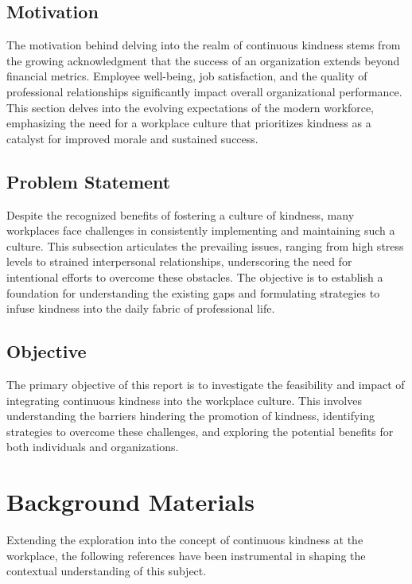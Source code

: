 \documentclass[a4paper, 11pt]{report}
\begin{document}
\subsection{Motivation}

The motivation behind delving into the realm of continuous kindness stems from the growing acknowledgment that the success of an organization extends beyond financial metrics. Employee well-being, job satisfaction, and the quality of professional relationships significantly impact overall organizational performance. This section delves into the evolving expectations of the modern workforce, emphasizing the need for a workplace culture that prioritizes kindness as a catalyst for improved morale and sustained success.

\subsection{Problem Statement}
Despite the recognized benefits of fostering a culture of kindness, many workplaces face challenges in consistently implementing and maintaining such a culture. This subsection articulates the prevailing issues, ranging from high stress levels to strained interpersonal relationships, underscoring the need for intentional efforts to overcome these obstacles. The objective is to establish a foundation for understanding the existing gaps and formulating strategies to infuse kindness into the daily fabric of professional life.

\subsection{Objective}
The primary objective of this report is to investigate the feasibility and impact of integrating continuous kindness into the workplace culture. This involves understanding the barriers hindering the promotion of kindness, identifying strategies to overcome these challenges, and exploring the potential benefits for both individuals and organizations.



\section{Background Materials}

Extending the exploration into the concept of continuous kindness at the workplace, the following references have been instrumental in shaping the contextual understanding of this subject.
\end{document}
